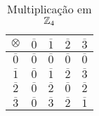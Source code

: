 \documentclass{beamer}
\begin{document}
    \begin{frame}
        \begin{exemplo}
                \begin{table}[!htb]
                  \caption{Multiplica\c{c}\~ao em $\mathbb{Z}_4$}
                  \begin{minipage}{.5\linewidth}
                  \centering
                    \begin{tabular}{|c|c|c|c|c|} 
                      \hline
                      $\otimes$ & $\overline{0}$ & $\overline{1}$ & $\overline{2}$ & $\overline{3}$\T\\
                      \hline
                      $\overline{0}$ & $\overline{0}$ & $\overline{0}$ & $\overline{0}$ & $\overline{0}$\T\\
                      \hline
                      $\overline{1}$ & $\overline{0}$ & $\overline{1}$ & $\overline{2}$ & $\overline{3}$\T\\
                      \hline
                      $\overline{2}$ & $\overline{0}$ & $\overline{2}$ & $\overline{0}$ & $\overline{2}$\T\\
                      \hline
                      $\overline{3}$ & $\overline{0}$ & $\overline{3}$ & $\overline{2}$ & $\overline{1}$\T\\
                      \hline
                    \end{tabular}
                \end{minipage}
            \end{table}
        \end{exemplo}
    \end{frame}
\end{document}
